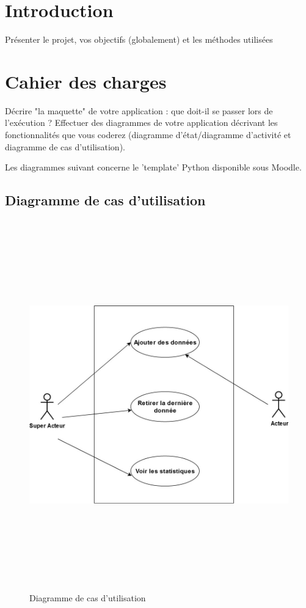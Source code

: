 \documentclass[french]{report}
\begin{document}
\chapter{Introduction}
Présenter le projet, vos objectifs (globalement) et les méthodes utilisées

\begin{figure}[H]
\end{figure}

\chapter{Cahier des charges}
Décrire "la maquette" de votre application : que doit-il se passer lors de l’exécution ?\newline
Effectuer des diagrammes de votre application décrivant les fonctionnalités que vous coderez (diagramme d’état/diagramme d'activité et diagramme de cas d'utilisation).

Les diagrammes suivant concerne le 'template' Python disponible sous Moodle.
\newpage
\section{Diagramme de cas d'utilisation}
\begin{figure}[!h]
\includegraphics[width=16cm, height=16cm]{Case-Diagram.jpg}
\caption{\label{fig:1} Diagramme de cas d'utilisation}
\end{figure}
\newpage
\end{document}
